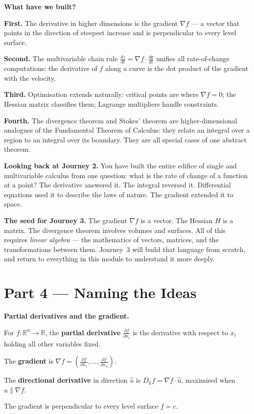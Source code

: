 \documentclass[12pt, a4paper]{article}
\begin{document}
\begin{discoverybox}
\textbf{What have we built?}

\textbf{First.} The derivative in higher dimensions is the gradient $\nabla f$ --- a vector that points in the direction of steepest increase and is perpendicular to every level surface.

\textbf{Second.} The multivariable chain rule $\frac{dz}{dt} = \nabla f \cdot \frac{d\mathbf{r}}{dt}$ unifies all rate-of-change computations: the derivative of $f$ along a curve is the dot product of the gradient with the velocity.

\textbf{Third.} Optimisation extends naturally: critical points are where $\nabla f = 0$; the Hessian matrix classifies them; Lagrange multipliers handle constraints.

\textbf{Fourth.} The divergence theorem and Stokes' theorem are higher-dimensional analogues of the Fundamental Theorem of Calculus: they relate an integral over a region to an integral over its boundary. They are all special cases of one abstract theorem.

\medskip
\textbf{Looking back at Journey 2.} You have built the entire edifice of single and multivariable calculus from one question: what is the rate of change of a function at a point? The derivative answered it. The integral reversed it. Differential equations used it to describe the laws of nature. The gradient extended it to space.

\medskip
\textbf{The seed for Journey 3.} The gradient $\nabla f$ is a vector. The Hessian $H$ is a matrix. The divergence theorem involves volumes and surfaces. All of this requires \emph{linear algebra} --- the mathematics of vectors, matrices, and the transformations between them. Journey~3 will build that language from scratch, and return to everything in this module to understand it more deeply.
\end{discoverybox}

\section{Part 4 \texorpdfstring{---}{--} Naming the Ideas}

\begin{namebox}
\textbf{Partial derivatives and the gradient.}

For $f : \mathbb{R}^n \to \mathbb{R}$, the \textbf{partial derivative} $\frac{\partial f}{\partial x_i}$ is the derivative with respect to $x_i$ holding all other variables fixed.

The \textbf{gradient} is $\nabla f = \left(\frac{\partial f}{\partial x_1}, \ldots, \frac{\partial f}{\partial x_n}\right)$.

The \textbf{directional derivative} in direction $\hat{u}$ is $D_{\hat{u}} f = \nabla f \cdot \hat{u}$, maximised when $\hat{u} \parallel \nabla f$.

The gradient is perpendicular to every level surface $f = c$.
\end{namebox}
\end{document}
